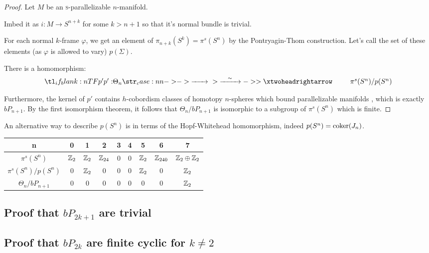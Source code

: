 \begin{proof}
	Let $M$ be an \textsc{s}-parallelizable $n$-manifold. 

	Imbed it as $i : M \to S^{n+k}$ for some $k>n+1$ so that it's normal bundle is trivial.

	For each normal $k$-frame $\varphi$, we get an element of $\pi_{n+k}(S^k) = \pi^s(S^n)$ by the Pontryagin-Thom construction. Let's call the set of these elements (as $\varphi$ is allowed to vary) $p(\Sigma)$. 


	\begin{lemma}
		There is a homomorphism:
		\[
			\lkxfunc{p'}{\Theta_n}{\pi^s(S^n)/p(S^n)}
		\]
	\end{lemma}

	Furthermore, the kernel of $p'$ contains $h$-cobordism classes of homotopy $n$-spheres which bound parallelizable manifolds , which is exactly $bP_{n+1}$. By the first isomorphism theorem, it follows that $\Theta_n/bP_{n+1}$ is isomorphic to a subgroup of $\pi^s(S^n)$ which is finite.
\end{proof}

An alternative way to describe $p(S^n)$ is in terms of the Hopf-Whitehead homomorphism, indeed $p(S^n) = \operatorname{coker}(J_n)$.
	\begin{center}
		\begin{tabular}{c|cccccccc}
			n & 0 & 1 & 2 & 3 & 4 & 5 & 6 & 7\\
			\hline
			$\pi^s(S^n)$ & $\mathbb{Z}_2$ & $\mathbb{Z}_2$ & $\mathbb{Z}_{24}$ & 0 & $0$ & $\mathbb{Z}_2$ & $\mathbb{Z}_{240}$ & $\mathbb{Z}_2\oplus\mathbb{Z}_2$\\
			$\pi^s(S^n) / p(S^n)$ & $0$ & $\mathbb{Z}_2$ & $0$ & 0 & $0$ & $\mathbb{Z}_2$ & $0$ & $\mathbb{Z}_2$\\
			$\Theta_n/bP_{n+1}$ & 0 & 0 & 0 & 0 & 0 & 0 & 0 & $\mathbb{Z}_2$
		\end{tabular}
	\end{center}

\subsection{Proof that $bP_{2k+1}$ are trivial}
\subsection{Proof that $bP_{2k}$ are finite cyclic for $k\neq 2$}
